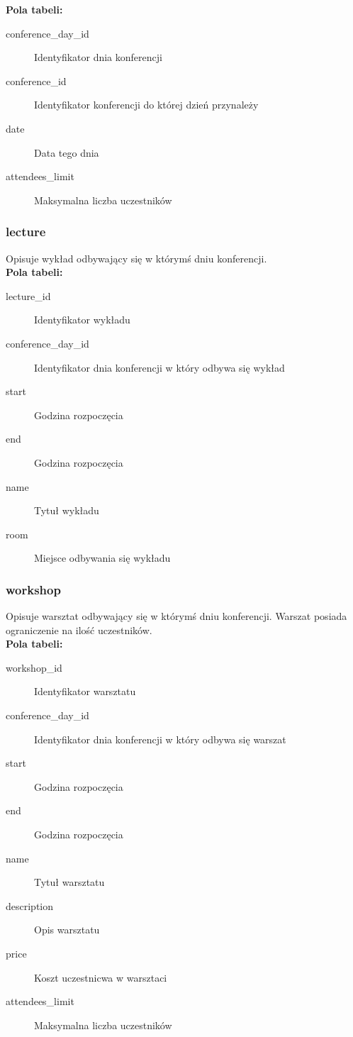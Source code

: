 \documentclass[12pt]{article}
\begin{document}
\textbf{Pola tabeli:}
\begin{description}
\item [conference\_day\_id] Identyfikator dnia konferencji
\item [conference\_id] Identyfikator konferencji do której dzień przynależy
\item [date] Data tego dnia
\item [attendees\_limit] Maksymalna liczba uczestników
\end{description}



\subsubsection{lecture}

Opisuje wykład odbywający się w którymś dniu konferencji.\\

\textbf{Pola tabeli:}
\begin{description}
\item [lecture\_id] Identyfikator wykładu
\item [conference\_day\_id] Identyfikator dnia konferencji w który odbywa się wykład
\item [start] Godzina rozpoczęcia
\item [end] Godzina rozpoczęcia
\item [name] Tytuł wykładu
\item [room] Miejsce odbywania się wykładu
\end{description}



\subsubsection{workshop}
Opisuje warsztat odbywający się w którymś dniu konferencji. Warszat posiada ograniczenie na ilość uczestników. \\

\textbf{Pola tabeli:}
\begin{description}
\item [workshop\_id] Identyfikator warsztatu
\item [conference\_day\_id] Identyfikator dnia konferencji w który odbywa się warszat
\item [start] Godzina rozpoczęcia
\item [end] Godzina rozpoczęcia
\item [name] Tytuł warsztatu
\item [description] Opis warsztatu
\item [price] Koszt uczestnicwa w warsztaci
\item [attendees\_limit] Maksymalna liczba uczestników
\end{description}
\end{document}
